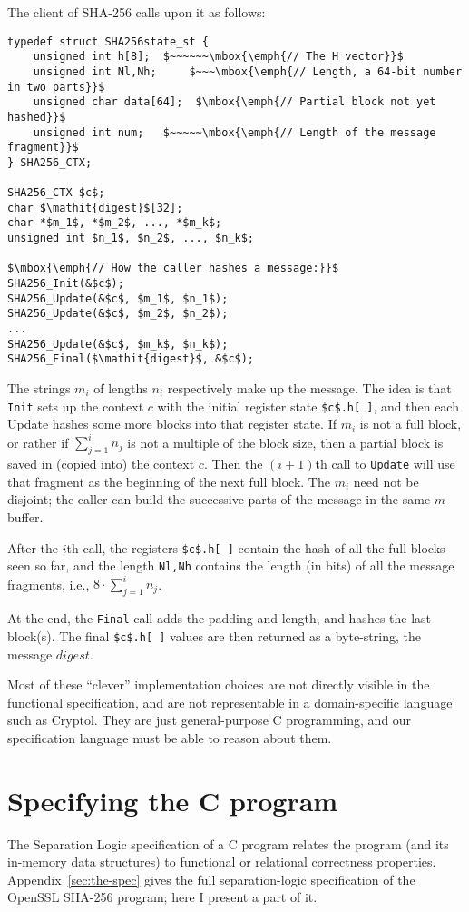 \documentclass[prodmode,acmtoplas]{acmsmall}
\begin{document}
\noindent The client of SHA-256 calls upon it as follows:

\begin{lstlisting}
typedef struct SHA256state_st {
    unsigned int h[8];  $~~~~~~\mbox{\emph{// The H vector}}$
    unsigned int Nl,Nh;     $~~~\mbox{\emph{// Length, a 64-bit number in two parts}}$
    unsigned char data[64];  $\mbox{\emph{// Partial block not yet hashed}}$
    unsigned int num;   $~~~~~\mbox{\emph{// Length of the message fragment}}$
} SHA256_CTX;

SHA256_CTX $c$;
char $\mathit{digest}$[32];
char *$m_1$, *$m_2$, ..., *$m_k$;
unsigned int $n_1$, $n_2$, ..., $n_k$;

$\mbox{\emph{// How the caller hashes a message:}}$
SHA256_Init(&$c$);
SHA256_Update(&$c$, $m_1$, $n_1$);
SHA256_Update(&$c$, $m_2$, $n_2$);
...
SHA256_Update(&$c$, $m_k$, $n_k$);
SHA256_Final($\mathit{digest}$, &$c$);
\end{lstlisting}
The strings $m_i$ of lengths $n_i$ respectively
make up the message.  The idea is that \lstinline{Init}
sets up the context $c$ with 
the initial register state \lstinline{$c$.h[ ]}, 
and then each Update hashes some more blocks
into that register state.  If $m_i$ is not
a full block, or rather if $\sum_{j=1}^i n_j$ is not
a multiple of the block size, then a partial
block is saved in (copied into) the context $c$.
Then the $(i+1)$th call to \lstinline{Update} will
use that fragment as the beginning of the next full block.
The $m_i$ need not be disjoint; the caller can
build the successive parts of the message in the same $m$ buffer.

After the $i$th call, the registers \lstinline{$c$.h[ ]}
contain the hash of all the full blocks seen so far,
and the length \lstinline{Nl,Nh} contains the
length (in bits) of all the message fragments,
i.e., $8 \cdot \sum_{j=1}^i n_j$.

At the end, the \lstinline{Final} call adds the
padding and length, and hashes the last block(s).
The final \lstinline{$c$.h[ ]} values are then
returned as a byte-string, the message $\mathit{digest}$.

Most of these ``clever'' implementation choices
are not directly visible in the functional specification,
and are not representable in a domain-specific language
such as Cryptol.  They are just general-purpose C programming,
and our specification language must be able to reason
about them.

\section{Specifying the C program}
The Separation Logic specification of a C program
relates the program (and its in-memory data structures)
to functional or relational correctness properties.
Appendix~\ref{sec:the-spec} gives the full separation-logic specification
of the OpenSSL SHA-256 program; 
here I present a part of it.
\end{document}
